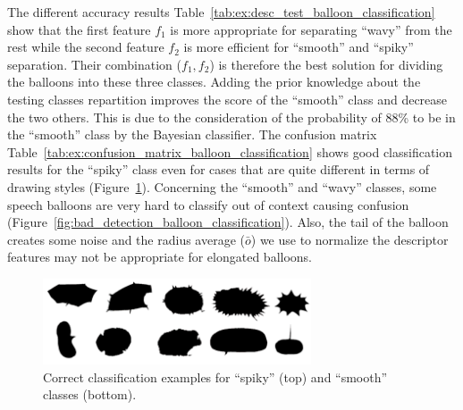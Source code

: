 The different accuracy results Table~\ref{tab:ex:desc_test_balloon_classification} show that the first feature $f_1$ is more appropriate for separating ``wavy'' from the rest while the second feature $f_2$ is more efficient for ``smooth'' and ``spiky'' separation.
Their combination ($f_1, f_2$) is therefore the best solution for dividing the balloons into these three classes.
Adding the prior knowledge about the testing classes repartition improves the score of the ``smooth'' class and decrease the two others.
This is due to the consideration of the probability of 88\% to be in the ``smooth'' class by the Bayesian classifier.
The confusion matrix Table~\ref{tab:ex:confusion_matrix_balloon_classification} shows good classification results for the ``spiky'' class even for cases that are quite different in terms of drawing styles (Figure~\ref{fig:good_detection_balloon_classification}).
Concerning the ``smooth'' and ``wavy'' classes, some speech balloons are very hard to classify out of context causing confusion (Figure~\ref{fig:bad_detection_balloon_classification}).
Also, the tail of the balloon creates some noise and the radius average ($\bar{o}$) we use to normalize the descriptor features may not be appropriate for elongated balloons.


  \begin{figure}[h]  %
    \centering
    \includegraphics[trim = 0mm 0mm 0mm 0mm, clip, width=300px]{good_detection.png}
    \caption[Correct classification examples for ``spiky'' and ``smooth'' classes]{Correct classification examples for ``spiky'' (top) and ``smooth'' classes (bottom).}
    \label{fig:good_detection_balloon_classification}
  \end{figure}



